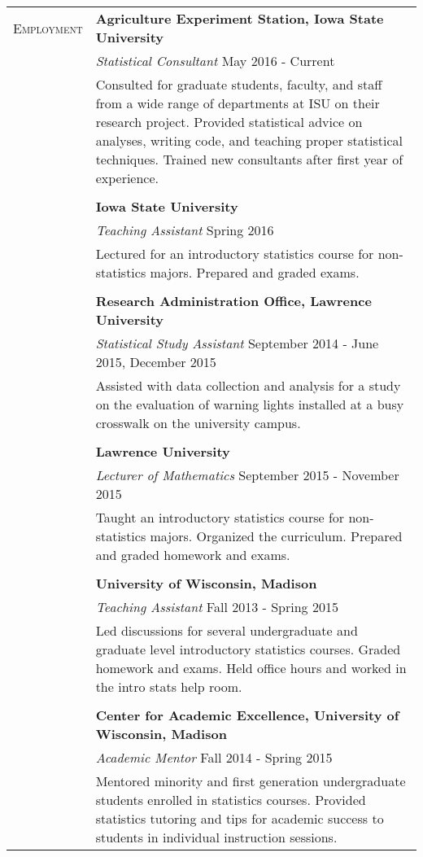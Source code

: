 \documentclass[11pt, oneside]{article}
\begin{document}
\noindent 
\begin{longtable}{p{3cm}p{14cm}}
\textsc{Employment} & \textbf{Agriculture Experiment Station, Iowa State University}\\
& \indent \emph{Statistical Consultant} \hfill{May 2016 - Current}\\
& \indent Consulted for graduate students, faculty, and staff from a wide range of departments at ISU on their research project. Provided statistical advice on analyses, writing code, and teaching proper statistical techniques. Trained new consultants after first year of experience.\\
\\
& \textbf{Iowa State University}\\
& \emph{Teaching Assistant} \hfill{Spring 2016}\\
& Lectured for an introductory statistics course for non-statistics majors. Prepared and graded exams.\\
\\
& \textbf{Research Administration Office, Lawrence University}\\
& \emph{Statistical Study Assistant} \hfill{September 2014 - June 2015, December 2015}\\
& Assisted with data collection and analysis for a study on the evaluation of warning lights installed at a busy crosswalk on the university campus.\\
\\
& \textbf{Lawrence University}\\
& \emph{Lecturer of Mathematics} \hfill{September 2015 - November 2015}\\
& Taught an introductory statistics course for non-statistics majors. Organized the curriculum. Prepared and graded homework and exams.\\
\\
& \textbf{University of Wisconsin, Madison}\\
& \emph{Teaching Assistant} \hfill{Fall 2013 - Spring 2015}\\
& Led discussions for several undergraduate and graduate level introductory statistics courses. Graded homework and exams. Held office hours and worked in the intro stats help room.\\
\\
& \textbf{Center for Academic Excellence, University of Wisconsin, Madison}\\
& \emph{Academic Mentor} \hfill{Fall 2014 - Spring 2015}\\
& Mentored minority and first generation undergraduate students enrolled in statistics courses. Provided statistics tutoring and tips for academic success to students in individual instruction sessions.
\end{longtable}
\end{document}
